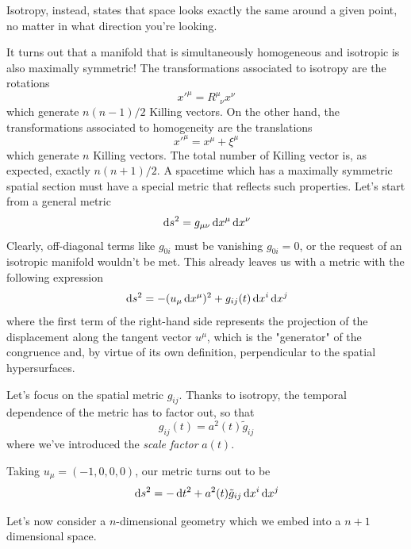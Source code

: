 \par Isotropy, instead, states that space looks exactly the same around a given point, no matter in what direction you're looking.
\par It turns out that a manifold that is simultaneously homogeneous and isotropic is also maximally symmetric! The transformations associated to isotropy are the rotations 
\begin{equation}
    x'^{\mu} = R^{\mu}_{\;\;\nu}x^{\nu}
    \label{eq:rotations}
\end{equation}
which generate $n(n-1)/2$ Killing vectors. On the other hand, the transformations associated to homogeneity are the translations
\begin{equation}
    x'^{\mu} = x^{\mu} + \xi^{\mu}
    \label{eq:translations}
\end{equation}
which generate $n$ Killing vectors. The total number of Killing vector is, as expected, exactly $n(n+1)/2$. A spacetime which has a maximally symmetric spatial section must have a special metric that reflects such properties. Let's start from a general metric
\begin{equation}
    \,\text{d}s^{2} = g_{\mu\nu}\,\text{d}x^{\mu}\,\text{d}x^{\nu}
\end{equation}
Clearly, off-diagonal terms like $g_{0i}$ must be vanishing $g_{0i} = 0$, or the request of an isotropic manifold wouldn't be met. This already leaves us with a metric with the following expression 
\begin{equation}
    \,\text{d}s^{2} = -(u_{\mu}\,\text{d}x^{\mu})^{2} + g_{ij}(t)\,\text{d}x^{i}\,\text{d}x^{j}
\end{equation}
where the first term of the right-hand side represents the projection of the displacement along the tangent vector $u^{\mu}$, which is the "generator" of the congruence and, by virtue of its own definition, perpendicular to the spatial hypersurfaces.
\par Let's focus on the spatial metric $g_{ij}$. Thanks to isotropy, the temporal dependence of the metric has to factor out, so that 
\begin{equation}
    g_{ij}(t) = a^{2}(t)\tilde{g}_{ij}
\end{equation}
where we've introduced the \emph{scale factor} $a(t)$.
\par Taking $u_{\mu} = (-1,0,0,0)$, our metric turns out to be
\begin{equation}
    \,\text{d}s^{2} = -\,\text{d}t^{2} + a^{2}(t)\tilde{g}_{ij}\,\text{d}x^{i}\,\text{d}x^{j}
\end{equation}
\par Let's now consider a $n$-dimensional geometry which we embed into a $n+1$ dimensional space.

